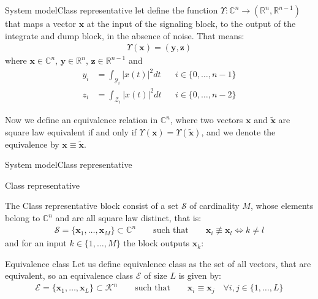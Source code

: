 \documentclass[en]{sdqbeamer}
\begin{document}
\begin{frame}[t]{System model}{Class representative}
let define the function $\Upsilon: \mathds{C}^n\to(\mathds{R}^n,\mathds{R}^{n-1})$ that maps a vector $\bm x$ at the input of the signaling block, to the output of the integrate and dump block, in the absence of noise. That means:
\begin{align}
	\Upsilon(\bm x) = (\bm y, \bm z)
\end{align}
where $\bm x\in\mathds{C}^n$, $\bm y\in\mathds{R}^n$, $\bm z\in\mathds{R}^{n-1}$ and 
\begin{align}
	y_i&=\int_{\mathcal Y_i}\bigl|x(t)\bigr|^2dt&&i\in \{0,\dotsc,n-1\}\\
	z_i&=\int_{\mathcal Z_i}\bigl|x(t)\bigr|^2dt&&i\in \{0,\dotsc,n-2\}
\end{align}

Now we define an equivalence relation in $\mathds C^n$, where two vectors $\bm x$ and $\bm{\tilde{x}}$ are square law equivalent if and only if $\Upsilon(\bm x)=\Upsilon(\bm{\tilde{x}})$, and we denote the equivalence by $\bm x \equiv \bm{\tilde{x}}$.

\end{frame}



\begin{frame}{System model}{Class representative}
		\begin{greenblock}{Class representative}

The Class representative block consist of a set $\mathcal S$ of cardinality $M$, whose elements belong to $\mathds{C}^n$ and are all square law distinct, that is:
\begin{align}
	\mathcal S = \{\bm x_1, \dotsc,\bm x_M\} \subset\mathds C^n\qquad \text{such that}\qquad\bm x_i\not\equiv\bm x_l \Leftrightarrow k\neq l
\end{align}
and for an input $k\in\{1,\dotsc,M\}$ the block outputs $\bm x_k$:
\end{greenblock}

\begin{greenblock}{Equivalence class}
Let us define equivalence class as the set of all vectors, that are equivalent, so an equivalence class $\mathcal{E}$ of size $L$ is given by:
\begin{align}
	\mathcal E=\{\bm x_1, \dotsc,\bm x_L\} \subset\mathcal K^n\qquad \text{such that}\qquad\bm x_i\equiv\bm x_j\quad \forall i,j \in \{1,\dotsc,L\} 
\end{align}

\end{greenblock}

\end{frame}
\end{document}

